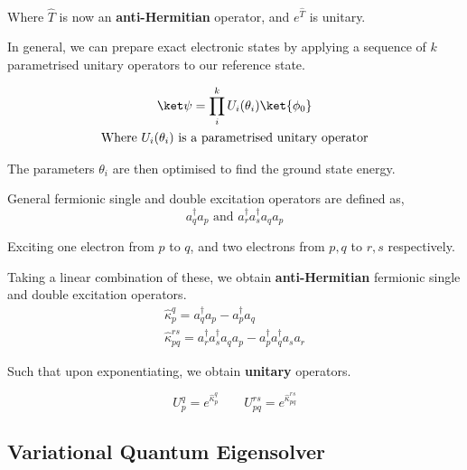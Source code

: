 Where $\hat T$ is now an \textbf{anti-Hermitian} operator, and $e^{\hat T}$ is unitary.

In general, we can prepare exact electronic states by applying a sequence of $k$ parametrised unitary operators to our reference state.

\begin{equation*}
\begin{gathered}
    \ket\psi = \prod_i^k U_i(\theta_i) \ket{\phi_0} \\
    \text{Where $U_i(\theta_i)$ is a parametrised unitary operator}
\end{gathered}
\end{equation*}\smallskip

The parameters $\theta_i$ are then optimised to find the ground state energy.

General fermionic single and double excitation operators are defined as,
\begin{equation*}
    a_q^\dagger a_p \text{ and } a_r^\dagger a_s^\dagger a_q a_p
\end{equation*}

Exciting one electron from $p$ to $q$, and two electrons from $p, q$ to $r, s$ respectively.

Taking a linear combination of these, we obtain \textbf{anti-Hermitian} fermionic single and double excitation operators.
\begin{equation*}
\begin{gathered}
    \hat\kappa_p^q = a_q^\dagger a_p - a_p^\dagger a_q \\
    \hat\kappa_{pq}^{rs} =
    a_r^\dagger a_s^\dagger a_q a_p - a_p^\dagger a_q^\dagger a_s a_r
\end{gathered}
\end{equation*}\smallskip

Such that upon exponentiating, we obtain \textbf{unitary} operators.

\begin{equation*}
    U^q_p = e^{\hat\kappa_p^q} \qquad
    U_{pq}^{rs} = e^{\hat\kappa_{pq}^{rs}}
\end{equation*}


\subsection{Variational Quantum Eigensolver}

